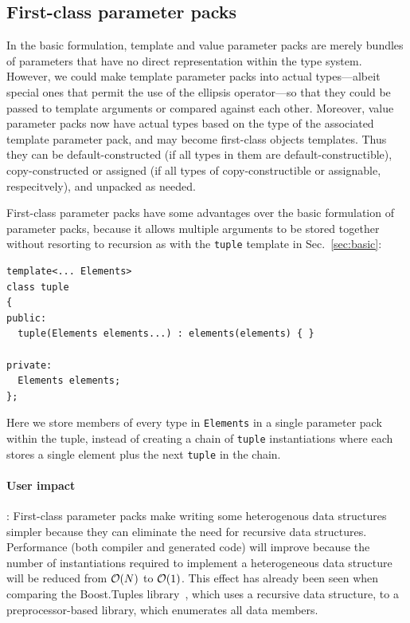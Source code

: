\documentclass{article}
\begin{document}
\subsection{First-class parameter packs}
\label{sec:first-class-pp}
In the basic formulation, template and value parameter packs are
merely bundles of parameters that have no direct representation within
the type system. However, we could make template parameter packs into
actual types---albeit special ones that permit the use of the ellipsis
operator---so that they could be passed to template arguments or
compared against each other. Moreover, value parameter packs now have
actual types based on the type of the associated template parameter
pack, and may become first-class objects templates. Thus they can be
default-constructed (if all types in them are default-constructible),
copy-constructed or assigned (if all types of copy-constructible or
assignable, respecitvely), and unpacked as needed. 

First-class parameter packs have some advantages over the basic
formulation of parameter packs, because it allows multiple arguments
to be stored together without resorting to recursion as with the
\texttt{tuple} template in Sec.~\ref{sec:basic}:
\begin{verbatim}
template<... Elements> 
class tuple
{
public:
  tuple(Elements elements...) : elements(elements) { }

private:
  Elements elements;
};
\end{verbatim}

Here we store members of every type in \texttt{Elements} in a single
parameter pack within the tuple, instead of creating a chain of
\texttt{tuple} instantiations where each stores a single element plus
the next \texttt{tuple} in the chain. 

\paragraph{User impact}: First-class parameter packs make writing some
heterogenous data structures simpler because they can eliminate the
need for recursive data structures. Performance (both compiler and
generated code) will improve because the number of instantiations
required to implement a heterogeneous data structure will be reduced
from ${\cal O}(N)$ to ${\cal O}(1)$. This effect has already been seen
when comparing the Boost.Tuples library~\cite{Tuples01}, which uses a
recursive data structure, to a preprocessor-based library, which
enumerates all data members. 
\end{document}
